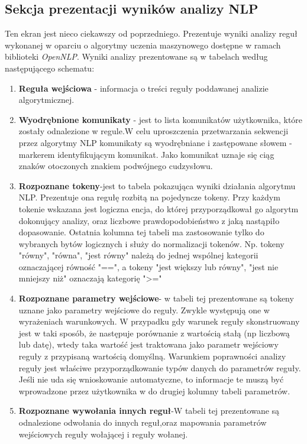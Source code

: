 \subsection{Sekcja prezentacji wyników analizy NLP}
Ten ekran jest nieco ciekawszy od poprzedniego. Prezentuje wyniki analizy reguł wykonanej w
oparciu o algorytmy uczenia maszynowego dostępne w ramach biblioteki \textit{OpenNLP}.
Wyniki analizy prezentowane są w tabelach według następującego schematu:

\begin{enumerate}
	\item \textbf{Reguła wejściowa} - informacja o treści reguły poddawanej analizie algorytmicznej.
	\item	\textbf{Wyodrębnione komunikaty} - jest to lista komunikatów użytkownika, które zostały odnalezione w regule.W celu uproszczenia przetwarzania sekwencji przez algorytmy NLP komunikaty są wyodrębniane i zastępowane
	słowem - markerem identyfikującym komunikat. Jako komunikat uznaje się ciąg znaków otoczonych znakiem podwójnego cudzysłowu.
	\item \textbf{Rozpoznane tokeny}-jest to tabela pokazująca wyniki działania algorytmu NLP. Prezentuje ona regułę rozbitą na pojedyncze tokeny.
	Przy każdym tokenie  wskazana jest logiczna encja, do której przyporządkował go algorytm dokonujący analizy, oraz liczbowe prawdopodobieństwo z jaką nastąpiło dopasowanie.
	Ostatnia kolumna tej tabeli ma zastosowanie tylko do wybranych bytów logicznych i służy do normalizacji tokenów. Np. tokeny "równy", "równa", "jest równy" należą do jednej wspólnej kategorii oznaczającej równość "==", a tokeny "jest większy lub równy", "jest nie mniejszy niż" oznaczają kategorię ">="
	\item \textbf{Rozpoznane parametry wejściowe}- w tabeli tej prezentowane są tokeny uznane jako parametry wejściowe do reguły. Zwykle występują one w wyrażeniach warunkowych.
	W przypadku gdy warunek reguły skonstruowany jest w taki sposób, że następuje porównanie z wartością stałą (np liczbową lub datę), wtedy taka wartość jest traktowana jako parametr wejściowy reguły z przypisaną wartością domyślną.
	Warunkiem poprawności analizy reguły jest właściwe przyporządkowanie typów danych do parametrów reguły. Jeśli nie uda się wnioskowanie automatyczne, to informacje te muszą być wprowadzone przez użytkownika w do drugiej kolumny tabeli parametrów.
	\item \textbf{Rozpoznane wywołania innych reguł}-W tabeli tej prezentowane są odnalezione odwołania do innych reguł,oraz mapowania parametrów wejściowych reguły wołającej i reguły wołanej.
\end{enumerate}
